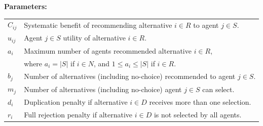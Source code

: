 \documentclass[11pt, letterpaper]{article}
\begin{document}
\begin{flushleft}
{\bf Parameters:}
\end{flushleft}
\vspace{-0.1in}
\begin{tabular}{l@{\quad}l}
$C_{ij}$ & Systematic benefit of recommending alternative $i \in R$ to agent $j \in S$. \\
$u_{ij}$ & Agent $j \in S$ utility of alternative $i \in R$. \\ %
$a_i$ & Maximum number of agents  recommended alternative $i\in R$, \\ & %
 where $a_i = |S|$ if $i \in N$, and $1 \leq a_i \leq |S|$ if $i \in R$. \\
$b_j$ & Number of  alternatives (including no-choice) recommended to agent $j \in S$. \\ %
$m_j$ & Number of  alternatives (including no-choice) agent $j \in S$ can select. \\ %
$d_i$ & Duplication penalty if alternative $i \in D$ receives  more than one  selection. \\
$r_i$ & Full rejection penalty if alternative $i \in D$ is not selected by all agents. \\ 
\end{tabular} 
\vspace{0.1in}





\end{document}

